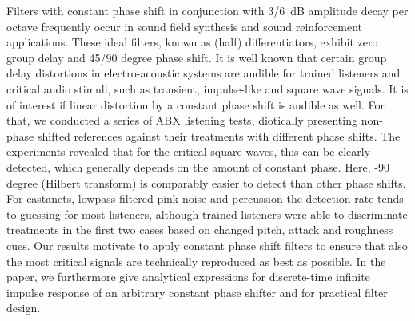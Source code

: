 Filters with constant phase shift in conjunction with 3/6~dB
amplitude decay per octave frequently occur in sound field synthesis and
sound reinforcement applications.
%
These ideal filters, known as (half) differentiators, exhibit
zero group delay and 45/90 degree phase shift.
%
It is well known that certain group delay distortions in electro-acoustic
systems are audible for trained listeners and critical audio stimuli,
such as transient, impulse-like and square wave signals.
%
It is of interest if linear distortion by a constant phase shift is audible as
well.
%
For that, we conducted a series of ABX listening tests, diotically presenting non-phase
shifted references against their treatments with different phase shifts.
%
The experiments revealed that for the critical
square waves, this can be clearly detected, which generally
depends on the amount of constant phase.
%
Here, -90 degree (Hilbert transform) is comparably easier
to detect than other phase shifts.
%
For castanets, lowpass filtered pink-noise and percussion the detection rate
tends to guessing for most listeners, although trained listeners were able to
discriminate treatments in the first two cases based on changed
pitch, attack and roughness cues.
%
Our results motivate to apply constant phase shift filters
to ensure that also the most critical signals are
technically reproduced as best as possible.
%
In the paper, we furthermore give analytical expressions for
discrete-time infinite impulse response of an arbitrary constant phase shifter
and for practical filter design.
